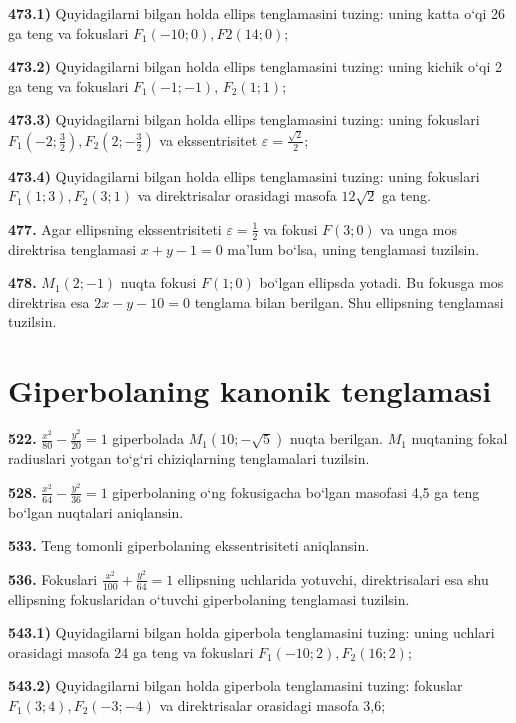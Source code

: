 \textbf{473.1)} Quyidagilarni bilgan holda ellips tenglamasini tuzing: uning katta o‘qi 26 ga teng va fokuslari $F_1 (-10; 0), F2 (14; 0) $;

\textbf{473.2)} Quyidagilarni bilgan holda ellips tenglamasini tuzing: uning kichik o‘qi 2 ga teng va fokuslari $F_1 (-1;-1) $, $F_2 (1; 1) $;

\textbf{473.3)} Quyidagilarni bilgan holda ellips tenglamasini tuzing: uning fokuslari $F_1\left(-2; \frac{3}{2}\right), F_2\left(2;-\frac{3}{2}\right) $ va ekssentrisitet $\varepsilon=\frac{\sqrt{2}}{2}$;

\textbf{473.4)} Quyidagilarni bilgan holda ellips tenglamasini tuzing: uning fokuslari $F_1 (1; 3), F_2 (3; 1) $ va direktrisalar orasidagi masofa $12 \sqrt{2}$ ga teng.

\textbf{477.} Agar ellipsning ekssentrisiteti $\varepsilon=\frac{1}{2}$ va fokusi $F(3 ; 0)$ va unga mos direktrisa tenglamasi $x+y-1=0$ ma’lum bo‘lsa, uning tenglamasi tuzilsin.

\textbf{478.} $M_1 (2;-1)$ nuqta fokusi $F (1;0)$ bo‘lgan ellipsda yotadi. Bu fokusga mos direktrisa esa $2x-y-10=0$ tenglama bilan berilgan. Shu ellipsning tenglamasi tuzilsin.


\section{Giperbolaning kanonik tenglamasi}



\textbf{522.} $\frac{x^2}{80}-\frac{y^2}{20}=1$ giperbolada $M_1 (10;-\sqrt{5}) $ nuqta berilgan. $M_1$ nuqtaning fokal radiuslari yotgan to‘g‘ri chiziqlarning tenglamalari tuzilsin.

\textbf{528.} $\frac{x^2}{64}-\frac{y^2}{36}=1$ giperbolaning o‘ng fokusigacha bo‘lgan masofasi 4,5 ga teng bo‘lgan nuqtalari aniqlansin.

\textbf{533.} Teng tomonli giperbolaning ekssentrisiteti aniqlansin.

\textbf{536.} Fokuslari $\frac{x^2}{100}+\frac{y^2}{64}=1$ ellipsning uchlarida yotuvchi, direktrisalari esa shu ellipsning fokuslaridan o‘tuvchi giperbolaning tenglamasi tuzilsin.

\textbf{543.1)} Quyidagilarni bilgan holda giperbola tenglamasini tuzing: uning uchlari orasidagi masofa 24 ga teng va fokuslari $F_1 (-10; 2), F_2 (16; 2) $;

\textbf{543.2)} Quyidagilarni bilgan holda giperbola tenglamasini tuzing: fokuslar $F_1 (3; 4), F_2 (-3;-4)$ va direktrisalar orasidagi masofa 3,6;

